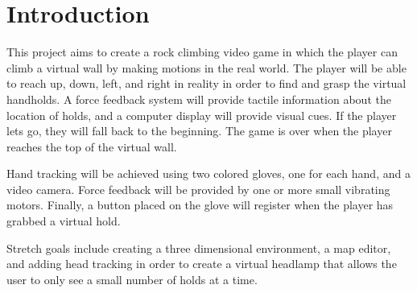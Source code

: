\section{Introduction}
\label{sec:intro}

This project aims to create a rock climbing video game in which the player can
climb a virtual wall by making motions in the real world. The player will be
able to reach up, down, left, and right in reality in order to find and grasp
the virtual handholds. A force feedback system will provide tactile information
about the location of holds, and a computer display will provide visual cues. If
the player lets go, they will fall back to the beginning. The game is over when
the player reaches the top of the virtual wall.

Hand tracking will be achieved using two colored gloves, one for each hand, and
a video camera.  Force feedback will be provided by one or more small vibrating
motors. Finally, a button placed on the glove will register when the player has
grabbed a virtual hold.

Stretch goals include creating a three dimensional environment, a map editor, and adding head
tracking in order to create a virtual headlamp that allows the user to only see
a small number of holds at a time.
